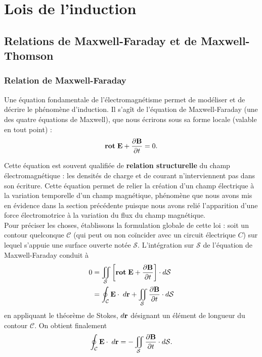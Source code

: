 \documentclass[11pt,a4paper]{report}
\begin{document}
\newpage
\section{Lois de l'induction}

\subsection{Relations de Maxwell-Faraday et de Maxwell-Thomson}

\subsubsection{Relation de Maxwell-Faraday}
Une équation fondamentale de l'électromagnétisme permet de modéliser et de décrire le phénomène d'induction. Il s'agît de l'équation de Maxwell-Faraday (une des quatre équations de Maxwell), que nous écrirons sous sa forme locale (valable en tout point) :
	\begin{equation}
		\textbf{rot}\;\bold{E} + \frac{\partial\bold{B}}{\partial t} = 0.		
	\end{equation}

Cette équation est souvent qualifiée de \textbf{relation structurelle} du champ électromagnétique : les densités de charge et de courant n'interviennent pas dans son écriture. Cette équation permet de relier la création d'un champ électrique à la variation temporelle d'un champ magnétique, phénomène que nous avons mis en évidence dans la section précédente puisque nous avons relié l'apparition d'une force électromotrice à la variation du flux du champ magnétique.\\

Pour préciser les choses, établissons la formulation globale de cette loi : soit un contour quelconque $\mathcal{C}$ (qui peut ou non coïncider avec un circuit électrique $C$) sur lequel s'appuie une surface ouverte notée $\mathcal{S}$. L'intégration sur $\mathcal{S}$ de l'équation de Maxwell-Faraday conduit à
\begin{align}
   0 & =  \iint_\mathcal{S} \left[\textbf{rot}\;\bold{E} + \frac{\partial\bold{B}}{\partial t}\right]\cdot d\mathcal{S}\\
   	 & =  \oint_\mathcal{C} \bold{E} \cdot \;d\bold{r} + \iint_\mathcal{S}\frac{\partial\bold{B}}{\partial t}\cdot d\mathcal{S}
\end{align}
en appliquant le théorème de Stokes, $d\bold{r}$ désignant un élément de longueur du contour $\mathcal{C}$. On obtient finalement
\begin{equation}
	\oint_\mathcal{C} \bold{E} \cdot \;d\bold{r} = - \iint_\mathcal{S}\frac{\partial\bold{B}}{\partial t}\cdot d\mathcal{S}.
\end{equation}
	
\end{document}
